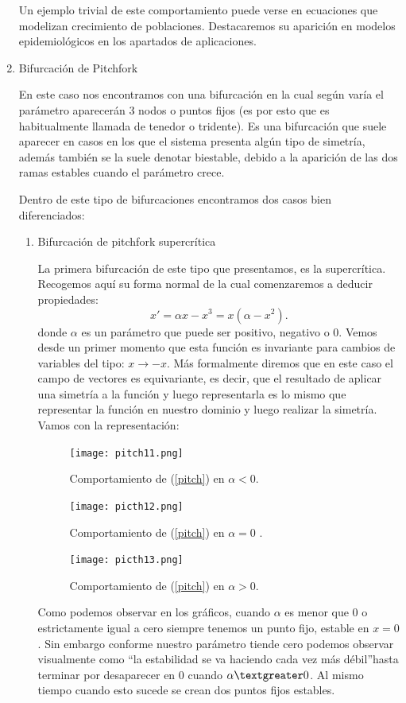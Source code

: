 \begin{enumerate}
Un ejemplo trivial de este comportamiento puede verse en ecuaciones que modelizan crecimiento de poblaciones. Destacaremos su aparición en modelos epidemiológicos en los apartados de aplicaciones.


\item Bifurcación de Pitchfork

En este caso nos encontramos con una bifurcación en la cual según varía el parámetro aparecerán 3 nodos o puntos fijos (es por esto que es habitualmente llamada de tenedor o tridente). Es una bifurcación que suele aparecer en casos en los que el sistema presenta algún tipo de simetría, además también se la suele denotar biestable, debido a la aparición de las dos ramas estables cuando el parámetro crece.

Dentro de este tipo de bifurcaciones encontramos dos casos bien diferenciados:
\begin{enumerate}
	\item Bifurcación de pitchfork supercrítica
	
	La primera bifurcación de este tipo que presentamos, es la supercrítica. Recogemos aquí su forma normal de la cual comenzaremos a deducir propiedades:
	\begin{equation}
	x'=\alpha x-x^3=x(\alpha-x^2).
	\label{pitch}
	\end{equation}
	donde $\alpha$ es un parámetro que puede ser positivo, negativo o 0.
	Vemos desde un primer momento que esta función es invariante para cambios de variables del tipo: $x \rightarrow -x$. Más formalmente diremos que en este caso el campo de vectores es equivariante, es decir, que el resultado de aplicar una simetría a la función y luego representarla es lo mismo que representar la función en nuestro dominio y luego realizar la simetría.
	Vamos con la representación: \\
	\begin{figure}[H]
		\centering
		\texttt{[image: pitch11.png]}
		\caption{Comportamiento de (\ref{pitch}) en $\alpha<0$. }
	\end{figure}
	\begin{figure}[H]
		\centering
		\texttt{[image: picth12.png]}
		\caption{Comportamiento de (\ref{pitch}) en $\alpha=0$ .}
	\end{figure}
	\begin{figure}[H]
		\centering
		\texttt{[image: picth13.png]}
		\caption{Comportamiento de (\ref{pitch}) en $\alpha>0$. }
	\end{figure}
	Como podemos observar en los gráficos, cuando $\alpha$ es menor que 0 o estrictamente igual a cero siempre tenemos un punto fijo, estable en $x=0$. Sin embargo conforme nuestro parámetro tiende  cero podemos observar visualmente como \textquotedblleft la estabilidad se va haciendo cada vez más débil\textquotedblright  hasta terminar por desaparecer en 0 cuando $\alpha \textgreater 0$. Al mismo tiempo cuando esto sucede se crean dos puntos fijos estables.
	

\end{enumerate}
\end{enumerate}
